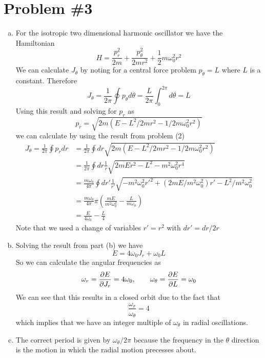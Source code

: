 \documentclass[11pt]{article}
\numberwithin{equation}{section}
\begin{document}
\pagebreak

\section{Problem \#3}
\begin{enumerate}[(a)]
\item For the isotropic two dimensional harmonic oscillator we have the Hamiltonian
$$H = \frac{p_r^2}{2m} + \frac{p_{\theta}^2}{2mr^2} + \frac{1}{2}m\omega_0^2r^2$$
We can calculate $J_{\theta}$ by noting for a central force problem $p_{\theta}=L$ where $L$
is a constant. Therefore
$$J_{\theta} = \frac{1}{2\pi}\oint{p_\theta}d\theta = \frac{L}{2\pi}\int_{0}^{2\pi}d\theta = L$$
Using this result and solving for $p_r$ as
$$p_r = \sqrt{2m(E-L^2/2mr^2-1/2m\omega_0^2r^2)}$$ 
we can calculate by using the result from problem (2)
\begin{align*}
J_{\theta} = \frac{1}{2\pi}\oint{p_r}dr &= \frac{1}{2\pi}\oint{dr}\sqrt{2m(E-L^2/2mr^2-1/2m\omega_0^2r^2)}\\
&= \frac{1}{2\pi}\oint{dr}\frac{1}{r}\sqrt{2mEr^2-L^2-m^2\omega_0^2r^4}\\
&= \frac{m\omega_0}{4\pi}\oint{dr'}\frac{1}{r'}\sqrt{-m^2\omega_0^2r'^2+(2mE/m^2\omega_0^2)r'-L^2/m^2\omega_0^2}\\
&= \frac{m\omega_0}{4\pi}\pi\left(\frac{mE}{m^2\omega_0^2}-\frac{L}{m\omega_0}\right)\\
&= \frac{E}{4\omega_0}-\frac{L}{4}
\end{align*}
Note that we used a change of variables $r'=r^2$ with $dr' = dr/2r$

\item Solving the result from part (b) we have
$$E = 4\omega_0J_r + \omega_0L$$
So we can calculate the angular frequencies as
$$\omega_r = \frac{\partial{E}}{\partial{J_r}} = 4\omega_0,\qquad \omega_{\theta}=\frac{\partial{E}}{\partial{L}} = \omega_0$$
We can see that this results in a closed orbit due to the fact that
$$\frac{\omega_r}{\omega_{\theta}} = 4$$
which implies that we have an integer multiple of $\omega_{\theta}$ in radial oscillations.

\item The correct period is given by $\omega_{\theta}/2\pi$ because the frequency in the $\theta$ 
direction is the motion in which the radial motion precesses about.
\end{enumerate}

\pagebreak
\end{document}
